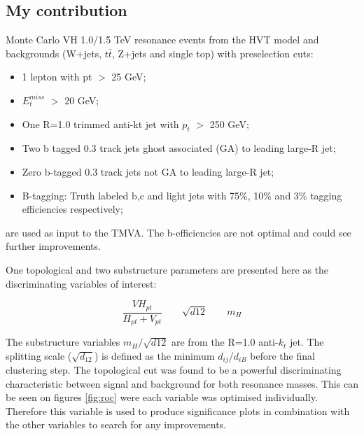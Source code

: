 \subsection{My contribution}
Monte Carlo VH 1.0/1.5 TeV resonance events from the HVT model and backgrounds (W+jets, $t\bar{t}$, Z+jets and single top) with preselection cuts:
\begin{itemize}
  \item 1 lepton with pt $>$ 25 GeV;
  \item $E_{t}^{miss}$ $>$ 20 GeV; 
  \item One R=1.0 trimmed anti-kt jet with $p_t$ $>$ 250 GeV;
	\item Two b tagged 0.3 track jets ghost associated (GA) to leading large-R jet;
	\item Zero b-tagged 0.3 track jets not GA to leading large-R jet;
	\item B-tagging: Truth labeled b,c and light jets with 75\%, 10\% and 3\% tagging efficiencies respectively;
\end{itemize}
are used as input to the TMVA. The b-efficiencies are not optimal and could see further improvements. 

One topological and two substructure parameters are presented here as the discriminating variables of interest:

\begin{equation}
\displaystyle
\frac{ VH_{pt}}{H_{pt}+V_{pt}} \qquad \sqrt{d12} \qquad m_{H} 
\label{eq:discrimVar}
\end{equation}

The substructure variables $m_{H}/\sqrt{d12}$ are from the R=1.0 anti-$k_t$ jet. The splitting scale ($\sqrt{d_{12}}$) is defined as the minimum $d_{ij}$/$d_{iB}$ before the final clustering step\cite{d12}. The topological cut was found to be a powerful discriminating characteristic between signal and background for both resonance masses. This can be seen on figures \ref{fig:roc} were each variable was optimised individually. Therefore this variable is used to produce significance plots in combination with the other variables to search for any improvements.    

